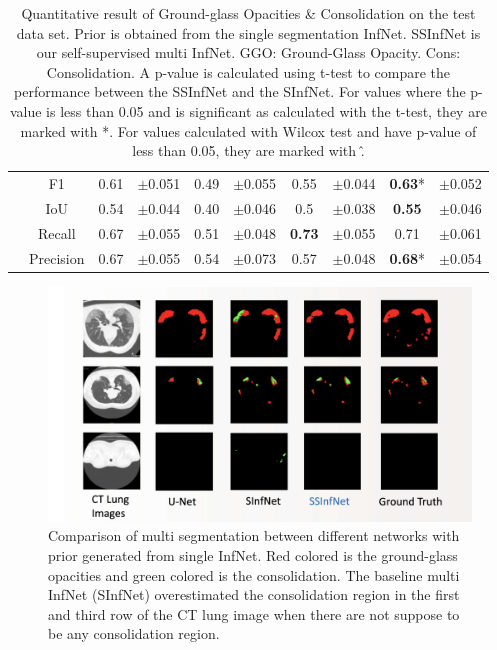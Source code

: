 \begin{table}[!h]
\begin{tabular}{ |c|c|c|c|c|c|c|c|c|c| }
		\multirow{4}{*}{\rotatebox[origin=c]{90}{Overall}} 
		& F1 &0.61 & $\pm$0.051 & 0.49 &$\pm$0.055 &0.55 &$\pm$0.044 &\textbf{0.63}* &$\pm$0.052 \\ \cline{2-10}
		& IoU & 0.54 & $\pm$0.044 & 0.40 &$\pm$0.046 &0.5 &$\pm$0.038 &\textbf{0.55} &$\pm$0.046 \\ \cline{2-10}
		& Recall &0.67 & $\pm$0.055 & 0.51 &$\pm$0.048 &\textbf{0.73} &$\pm$0.055 &0.71 &$\pm$0.061 \\ \cline{2-10}
		& Precision & 0.67 & $\pm$0.055 & 0.54 &$\pm$0.073 &0.57 &$\pm$0.048 &\textbf{0.68}* &$\pm$0.054 \\ \cline{2-10}
		\hline \hline
		
	\end{tabular}
\caption{Quantitative result of Ground-glass Opacities \& Consolidation on the test data set. Prior is obtained from the single segmentation InfNet. SSInfNet is our self-supervised multi InfNet. GGO: Ground-Glass Opacity. Cons: Consolidation. A p-value is calculated using t-test to compare the performance between the SSInfNet and the SInfNet. For values where the p-value is less than 0.05 and is significant as calculated with the t-test, they are marked with *. For values calculated with Wilcox test and have p-value of less than 0.05, they are marked with \^. }
\label{tab:multi-weakprior}
\end{table}


  \begin{figure}
 	\includegraphics[width=\linewidth]{comparison_multi_weakprior.png}
 	\caption{Comparison of multi segmentation between different networks with prior generated from single InfNet. Red colored is the ground-glass opacities and green colored is the consolidation. The baseline multi InfNet (SInfNet) overestimated the consolidation region in the first and third row of the CT lung image when there are not suppose to be any consolidation region.}
 	\label{fig:multi-weakprior-comparison}
 \end{figure}
